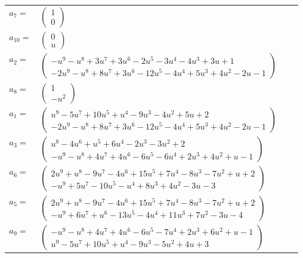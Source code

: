 \documentclass[1p]{elsarticle_modified}
\theoremstyle{definition}
\begin{document}
\begin{tabular}{m{7pt} m{180pt} m{7pt} m{180pt} }
\flushright $a_{7}=$&$\begin{pmatrix}1\\0\end{pmatrix}$ \\
\flushright $a_{10}=$&$\begin{pmatrix}0\\u\end{pmatrix}$ \\
\flushright $a_{2}=$&$\begin{pmatrix}- u^9- u^8+3 u^7+3 u^6-2 u^5-3 u^4-4 u^3+3 u+1\\-2 u^9- u^8+8 u^7+3 u^6-12 u^5-4 u^4+5 u^3+4 u^2-2 u-1\end{pmatrix}$ \\
\flushright $a_{8}=$&$\begin{pmatrix}1\\- u^2\end{pmatrix}$ \\
\flushright $a_{1}=$&$\begin{pmatrix}u^9-5 u^7+10 u^5+u^4-9 u^3-4 u^2+5 u+2\\-2 u^9- u^8+8 u^7+3 u^6-12 u^5-4 u^4+5 u^3+4 u^2-2 u-1\end{pmatrix}$ \\
\flushright $a_{3}=$&$\begin{pmatrix}u^8-4 u^6+u^5+6 u^4-2 u^3-3 u^2+2\\- u^9- u^8+4 u^7+4 u^6-6 u^5-6 u^4+2 u^3+4 u^2+u-1\end{pmatrix}$ \\
\flushright $a_{6}=$&$\begin{pmatrix}2 u^9+u^8-9 u^7-4 u^6+15 u^5+7 u^4-8 u^3-7 u^2+u+2\\- u^9+5 u^7-10 u^5- u^4+8 u^3+4 u^2-3 u-3\end{pmatrix}$ \\
\flushright $a_{5}=$&$\begin{pmatrix}2 u^9+u^8-9 u^7-4 u^6+15 u^5+7 u^4-8 u^3-7 u^2+u+2\\- u^9+6 u^7+u^6-13 u^5-4 u^4+11 u^3+7 u^2-3 u-4\end{pmatrix}$ \\
\flushright $a_{9}=$&$\begin{pmatrix}- u^9- u^8+4 u^7+4 u^6-6 u^5-7 u^4+2 u^3+6 u^2+u-1\\u^9-5 u^7+10 u^5+u^4-9 u^3-5 u^2+4 u+3\end{pmatrix}$ \\

\end{tabular}
\end{document}
